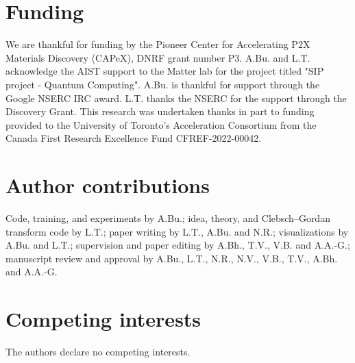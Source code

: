 \documentclass[pdflatex,sn-mathphys-num]{sn-jnl}%
\begin{document}
\section{Funding}
We are thankful for funding by the Pioneer Center for Accelerating P2X Materials Discovery (CAPeX), DNRF grant number P3.
A.Bu. and L.T. acknowledge the AIST support to the Matter lab for the project titled "SIP project - Quantum Computing".
A.Bu. is thankful for support through the Google NSERC IRC award.
L.T. thanks the NSERC for the support through the Discovery Grant.
This research was undertaken thanks in part to funding provided to the University of Toronto’s Acceleration Consortium from the Canada First Research Excellence Fund CFREF-2022-00042.

\section{Author contributions}
Code, training, and experiments by A.Bu.; idea, theory, and Clebsch--Gordan transform code by L.T.; paper writing by L.T., A.Bu. and N.R.; visualizations by A.Bu. and L.T.; supervision and paper editing by A.Bh., T.V., V.B. and A.A.-G.; manuscript review and approval by A.Bu., L.T., N.R., N.V., V.B., T.V., A.Bh. and A.A.-G.

\section{Competing interests}
The authors declare no competing interests.

\end{document}
